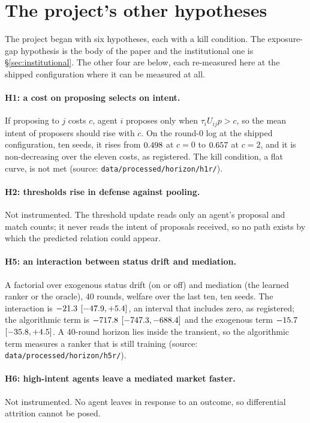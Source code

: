 
\section{The project's other hypotheses}
\label{app:hypotheses}

The project began with six hypotheses, each with a kill condition. The
exposure-gap hypothesis is the body of the paper and the institutional one is
\S\ref{sec:institutional}. The other four are below, each re-measured here at the
shipped configuration where it can be measured at all.

\paragraph{H1: a cost on proposing selects on intent.} If proposing to $j$ costs
$c$, agent $i$ proposes only when $\tau_i U_{ij} p > c$, so the mean intent of
proposers should rise with $c$. On the round-0 log at the shipped configuration,
ten seeds, it rises from $0.498$ at $c = 0$ to $0.657$ at $c = 2$, and it is
non-decreasing over the eleven costs, as registered. The kill condition, a flat
curve, is not met (source: \texttt{data/processed/horizon/h1r/}).

\paragraph{H2: thresholds rise in defense against pooling.} Not instrumented. The
threshold update reads only an agent's proposal and match counts; it never reads
the intent of proposals received, so no path exists by which the predicted
relation could appear.

\paragraph{H5: an interaction between status drift and mediation.} A factorial
over exogenous status drift (on or off) and mediation (the learned ranker or the
oracle), 40 rounds, welfare over the last ten, ten seeds. The interaction is
$-21.3$ $[-47.9, +5.4]$, an interval that includes zero, as
registered; the algorithmic term is $-717.8$ $[-747.3, -688.4]$ and
the exogenous term $-15.7$ $[-35.8, +4.5]$. A 40-round horizon
lies inside the transient, so the algorithmic term measures a ranker that is still
training (source: \texttt{data/processed/horizon/h5r/}).

\paragraph{H6: high-intent agents leave a mediated market faster.} Not
instrumented. No agent leaves in response to an outcome, so differential
attrition cannot be posed.
